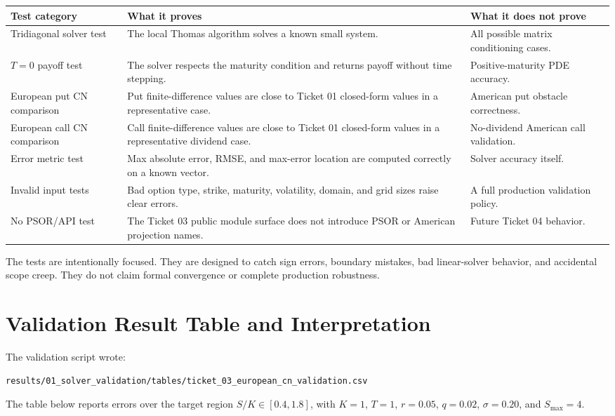 \documentclass[11pt,a4paper]{article}
\begin{document}
\begin{longtable}{L{0.25\textwidth}L{0.31\textwidth}L{0.32\textwidth}}
\toprule
Test category & What it proves & What it does not prove \\
\midrule
\endhead
Tridiagonal solver test &
The local Thomas algorithm solves a known small system. &
All possible matrix conditioning cases. \\
\(T=0\) payoff test &
The solver respects the maturity condition and returns payoff without time stepping. &
Positive-maturity PDE accuracy. \\
European put CN comparison &
Put finite-difference values are close to Ticket 01 closed-form values in a representative case. &
American put obstacle correctness. \\
European call CN comparison &
Call finite-difference values are close to Ticket 01 closed-form values in a representative dividend case. &
No-dividend American call validation. \\
Error metric test &
Max absolute error, RMSE, and max-error location are computed correctly on a known vector. &
Solver accuracy itself. \\
Invalid input tests &
Bad option type, strike, maturity, volatility, domain, and grid sizes raise clear errors. &
A full production validation policy. \\
No PSOR/API test &
The Ticket 03 public module surface does not introduce PSOR or American projection names. &
Future Ticket 04 behavior. \\
\bottomrule
\end{longtable}

The tests are intentionally focused. They are designed to catch sign errors, boundary mistakes,
bad linear-solver behavior, and accidental scope creep. They do not claim formal convergence or
complete production robustness.

\section{Validation Result Table and Interpretation}

The validation script wrote:
\begin{lstlisting}
results/01_solver_validation/tables/ticket_03_european_cn_validation.csv
\end{lstlisting}

The table below reports errors over the target region \(S/K\in[0.4,1.8]\), with \(K=1\),
\(T=1\), \(r=0.05\), \(q=0.02\), \(\sigma=0.20\), and \(S_{\max}=4\).
\end{document}
